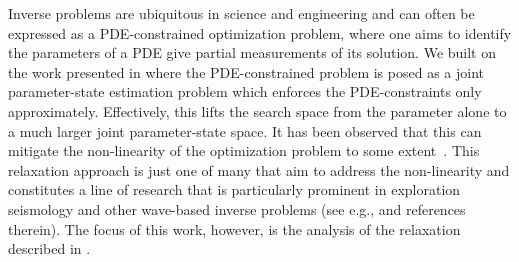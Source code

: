 \documentclass[12pt]{amsart}
\begin{document}

Inverse problems are ubiquitous in science and engineering and can often be expressed as a PDE-constrained optimization problem, where one aims to identify the parameters of a PDE give partial measurements of its solution. We built on the work presented in \cite{van2015penalty} where the PDE-constrained problem is posed as a joint parameter-state estimation problem which enforces the PDE-constraints only approximately. Effectively, this lifts the search space from the parameter alone to a much larger joint parameter-state space. It has been observed that this can mitigate the non-linearity of the optimization problem to some extent~\cite{van2015penalty, fang2020lift}. This relaxation approach is just one of many that aim to address the non-linearity and constitutes a line of research that is particularly prominent in exploration seismology and other wave-based inverse problems (see e.g., \cite{Symes2014,Warner2016,symes2020a,Symes2020} and references therein). The focus of this work, however, is the analysis of the relaxation described in \cite{van2015penalty}.
\end{document}
